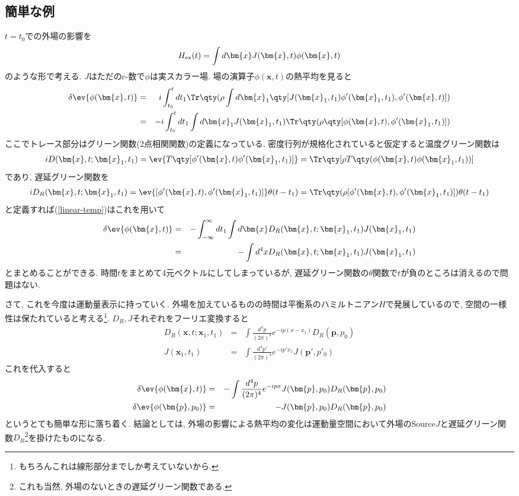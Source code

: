 \documentclass[10.5pt,a4paper]{jreport}
\begin{document}
\subsection{簡単な例}
$t = t_0$での外場の影響を
\begin{eqnarray}
  H_{\rm ex}(t) = \int d\bm{x} J(\bm{x}, t)\phi(\bm{x}, t)
\end{eqnarray}
のような形で考える. $J$はただのc-数で$\phi$は実スカラー場. 場の演算子$\phi(\bm{x}, t)$の熱平均を見ると
\begin{eqnarray}
  \delta\ev{\phi(\bm{x}, t)} &=& i\int_{t_0}^{t}dt_1 \Tr\qty(\rho\int d\bm{x}_1 \qty[J(\bm{x}_1, t_1)\phi'(\bm{x}_1, t_1), \phi'(\bm{x}, t)])\\
  &=& -i\int_{t_0}^{t}dt_1\int d\bm{x}_1J(\bm{x}_1, t_1)\Tr\qty(\rho\qty[\phi(\bm{x}, t), \phi'(\bm{x}_1, t_1)])\label{linear-temp}
\end{eqnarray}
ここでトレース部分はグリーン関数(2点相関関数)の定義になっている. 密度行列が規格化されていると仮定すると温度グリーン関数は
\begin{eqnarray}
  iD(\bm{x}, t; \bm{x}_1, t_1) =\ev{T\qty[\phi'(\bm{x}, t)\phi'(\bm{x}_1, t_1)]} = \Tr\qty[\rho T\qty(\phi(\bm{x}, t)\phi(\bm{x}_1, t_1))]
\end{eqnarray}
であり, 遅延グリーン関数を
\begin{eqnarray}
  iD_R(\bm{x}, t; \bm{x}_1, t_1) = \ev{[\phi'(\bm{x}, t), \phi'(\bm{x}_1, t_1)]}\theta(t-t_1) = \Tr\qty(\rho[\phi'(\bm{x}, t), \phi'(\bm{x}_1, t_1)])\theta(t-t_1)
\end{eqnarray}
と定義すれば(\ref{linear-temp})はこれを用いて
\begin{eqnarray}
  \delta\ev{\phi(\bm{x}, t)} &=& -\int_{-\infty}^\infty dt_1\int d\bm{x} D_R(\bm{x}, t; \bm{x}_1, t_1)J(\bm{x}_1, t_1)\\
  &=& -\int d^4xD_R(\bm{x}, t; \bm{x}_1, t_1)J(\bm{x}_1, t_1)
\end{eqnarray}
とまとめることができる. 時間$t$をまとめて4元ベクトルにしてしまっているが, 遅延グリーン関数の$\theta$関数で$t$が負のところは消えるので問題はない.

さて, これを今度は運動量表示に持っていく. 外場を加えているものの時間は平衡系のハミルトニアン$H$で発展しているので, 空間の一様性は保たれていると考える\footnote{もちろんこれは線形部分までしか考えていないから. }. $D_R, J$それぞれをフーリエ変換すると
\begin{eqnarray}
  D_R(\bm{x}, t; \bm{x}_1, t_1) &=& \int\frac{d^4p}{(2\pi)^4} e^{-ip(x-x_1)}D_R(\bm{p}, p_0)\\
  J(\bm{x}_1, t_1) &=& \int\frac{d^4p'}{(2\pi)^4}e^{-ip'x_1}J(\bm{p}', p'_0)
\end{eqnarray}
これを代入すると
\begin{eqnarray}
  \delta\ev{\phi(\bm{x}, t)} &=& -\int \frac{d^4p}{(2\pi)^4} e^{-ipx}J(\bm{p}, p_0)D_R(\bm{p}, p_0)\\
  \delta\ev{\phi(\bm{p}, p_0)} &=& -J(\bm{p}, p_0)D_R(\bm{p}, p_0)
\end{eqnarray}
というとても簡単な形に落ち着く. 結論としては, 外場の影響による熱平均の変化は運動量空間において外場のSource$J$と遅延グリーン関数$D_R$\footnote{これも当然, 外場のないときの遅延グリーン関数である. }を掛けたものになる.
\end{document}
